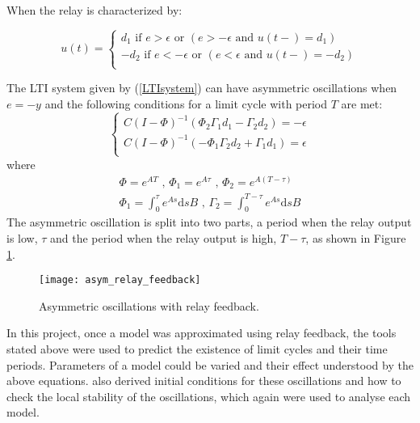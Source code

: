 \documentclass[a4paper, 12pt]{article}
\begin{document}
When the relay is characterized by:

\begin{equation}
	u(t)=\begin{cases}
	               d_1 \text{ if } e > \epsilon \text{ or } (e >-\epsilon \text{ and } u(t-) = d_1)\\
	                -d_2 \text{ if } e < -\epsilon \text{ or } (e < \epsilon \text{ and } u(t-) = -d_2)\\
	              
	            \end{cases}
                \label{asymmetric_relay_equation}
\end{equation}

The LTI system given by (\ref{LTIsystem}) can have asymmetric oscillations when $e=-y$ and the following conditions for a limit cycle with period $T$ are met:
\begin{equation}
\begin{cases}
C(I-\Phi)^{-1}(\Phi_2\Gamma_1d_1-\Gamma_2d_2) = -\epsilon \\
C(I-\Phi)^{-1}(-\Phi_1\Gamma_2d_2+\Gamma_1d_1) = \epsilon \\
\end{cases}
 \label{eqtn5_2}
\end{equation}
where
\begin{equation}
\begin{array}{l}
\displaystyle \Phi = e^{AT}  \text{  ,  }\Phi_1 = e^{A\tau} \text{  ,  }  \Phi_2 = e^{A(T-\tau)} \\
\displaystyle \Phi_1 = \int_0^\tau e^{As}\text{d}sB \text{  ,  } \Gamma_2 = \int_0^{T-\tau}e^{As}\text{d}sB
\end{array}
\end{equation}
The asymmetric oscillation is split into two parts, a period when the relay output is low, $\tau$ and the period when the relay output is high, $T-\tau$, as shown in Figure \ref{fig:asym_relay_oscillations}.

\begin{figure}[h!]
\texttt{[image: asym\_relay\_feedback]}
\caption{Asymmetric oscillations with relay feedback.}
\label{fig:asym_relay_oscillations}
\end{figure}

In this project, once a model was approximated using relay feedback, the tools stated above were used to predict the existence of limit cycles and their time periods. Parameters of a model could be varied and their effect understood by the above equations. \cite{astrom1995} also derived initial conditions for these oscillations and how to check the local stability of the oscillations, which again were used to analyse each model.
\end{document}
